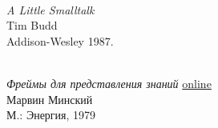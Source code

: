 \begin{thebibliography}{9}
 \\
\emph{A Little Smalltalk}\\
Tim Budd\\
Addison-Wesley 1987.

 \\
\emph{Фреймы для представления знаний}
\href{https://royallib.com/book/minskiy_marvin/freymi_dlya_predstavleniya_znaniy.html}{online}\\
Марвин Минский\\
М.: Энергия, 1979

\end{thebibliography}
